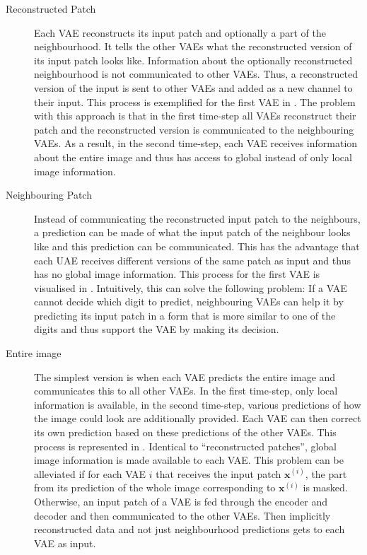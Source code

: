 \begin{description}
	\item [Reconstructed Patch] Each VAE reconstructs its input patch and optionally a part of the neighbourhood. It tells the other VAEs what the reconstructed version of its input patch looks like. Information about the optionally reconstructed neighbourhood is not communicated to other VAEs. Thus, a reconstructed version of the input is sent to other VAEs and added as a new channel to their input. This process is exemplified for the first VAE in . The problem with this approach is that in the first time-step all VAEs reconstruct their patch and the reconstructed version is communicated to the neighbouring VAEs. As a result, in the second time-step, each VAE receives information about the entire image and thus has access to global instead of only local image information.  
	\item [Neighbouring Patch] Instead of communicating the reconstructed input patch to the neighbours, a prediction can be made of what the input patch of the neighbour looks like and this prediction can be communicated. This has the advantage that each UAE receives different versions of the same patch as input and thus has no global image information. This process for the first VAE is visualised in . Intuitively, this can solve the following problem: If a VAE cannot decide which digit to predict, neighbouring VAEs can help it by predicting its input patch in a form that is more similar to one of the digits and thus support the VAE by making its decision. 
	\item[Entire image] The simplest version is when each VAE predicts the entire image and communicates this to all other VAEs. In the first time-step, only local information is available, in the second time-step, various predictions of how the image could look are additionally provided. Each VAE can then correct its own prediction based on these predictions of the other VAEs. This process is represented in . Identical to ``reconstructed patches'', global image information is made available to each VAE. This problem can be alleviated if for each VAE $i$ that receives the input patch $\boldsymbol{x}^{(i)}$, the part from its prediction of the whole image corresponding to $\boldsymbol{x}^{(i)}$ is masked. Otherwise, an input patch of a VAE is fed through the encoder and decoder and then communicated to the other VAEs. Then implicitly reconstructed data and not just neighbourhood predictions gets to each VAE as input. 
\end{description}



